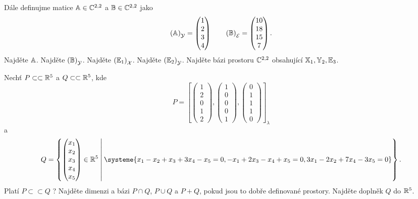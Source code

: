 \documentclass{article}
\newcommand{\mathbasis}{\ensuremath{\mathcal}}
\newcommand{\mathfield}{\ensuremath{\mathbb}}
\newcommand{\mathmat}{\ensuremath{\mathbb}}
\newcommand{\subspace}{\ensuremath{\subset \subset}}
\begin{document}
\begin{Exercise}[name=Úkol]
\[	\]
	Dále definujme matice \( \mathmat{A} \in \mathfield{C}^{2, 2} \) a \( \mathmat{B} \in \mathfield{C}^{2, 2} \) jako
	\[
		\left( \mathmat{A} \right)_\mathbasis{Y} = \begin{pmatrix} 1 \\ 2 \\ 3 \\ 4 \end{pmatrix} \qquad
		\left( \mathmat{B} \right)_\mathbasis{E} = \begin{pmatrix} 10 \\ 18 \\ 15 \\ 7 \end{pmatrix}\text{.}
	\]
	\Question Najděte \( \mathmat{A} \).
	\Question Najděte \( \left( \mathmat{B} \right)_\mathbasis{Y} \).
	\Question Najděte \( \left( \mathmat{E}_1 \right)_\mathbasis{X} \).
	\Question Najděte \( \left( \mathmat{E}_2 \right)_\mathbasis{Y} \).
	\Question Najděte bázi prostoru \( \mathfield{C}^{2, 2} \) obsahující \( \mathmat{X}_1, \mathmat{Y}_2, \mathmat{E}_3 \).
\end{Exercise}

\begin{Exercise}[name=Úkol]
	Nechť \( P \subspace \mathfield{R}^5 \) a \( Q \subspace \mathfield{R}^5 \), kde
	\[
		P = \left[
			\begin{pmatrix} 1 \\ 2 \\ 0 \\ 1 \\ 2 \end{pmatrix},
			\begin{pmatrix} 1 \\ 0 \\ 0 \\ 0 \\ 1 \end{pmatrix},
			\begin{pmatrix} 0 \\ 1 \\ 1 \\ 1 \\ 0 \end{pmatrix}
		\right]_\lambda
	\]
	a
	\[
		Q = \left\{
			\begin{pmatrix} x_1 \\ x_2 \\ x_3 \\ x_4 \\ x_5 \end{pmatrix} \in \mathfield{R}^5
			\: \middle| \:
			\systeme{
				x_1 - x_2 +x_3 + 3x_4 -x_5 = 0,
				-x_1 + 2x_3 - x_4 + x_5 = 0,
				3x_1 - 2x_2 + 7x_4 - 3x_5 = 0
			}
		\right\} \text{.}
	\]
	\Question Platí \( P \subspace Q \) ?
	\Question Najděte dimenzi a bázi \( P \cap Q \), \( P \cup Q \) a \( P + Q \), pokud jsou to dobře definované prostory.
	\Question Najděte doplněk \( Q \) do \( \mathfield{R}^5 \).
\end{Exercise}
\end{document}
